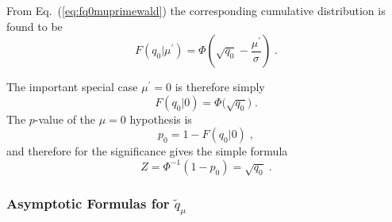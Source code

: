 \documentclass{cernrep}
\begin{document}
From Eq.~(\ref{eq:fq0muprimewald}) the corresponding cumulative
distribution is found to be
\begin{equation}
\label{cdfq0muprimewald}
F(q_0 | \mu^{\prime}) = \Phi \left( \sqrt{q_0} - \frac{\mu^{\prime}}{\sigma} 
\right) \;.
\end{equation}

The important special case $\mu^{\prime} = 0$ is therefore simply
\begin{equation}
\label{cdfq00wald}
F(q_0 | 0) = \Phi \Big( \sqrt{q_0} \Big)
\;.
\end{equation}
The $p$-value of the $\mu=0$ hypothesis is 
\begin{equation}
\label{eq:pval0}
p_0 = 1 - F(q_0 | 0) \;, 
\end{equation}
and therefore for the significance gives the simple formula
\begin{equation}
\label{eq:Z0}
Z = \Phi^{-1}(1 - p_0) = \sqrt{q_0} \;.
\end{equation}


 \subsubsection{Asymptotic Formulas for $\tilde q_{\mu}$}
 \label{sec:tildeqmu}
 
\end{document}
